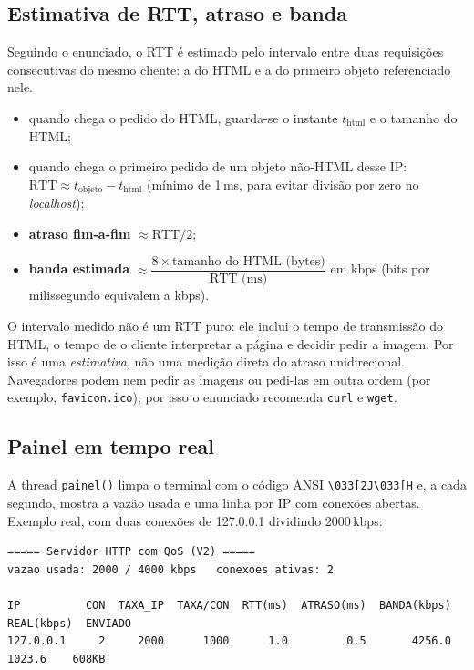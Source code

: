 \documentclass[11pt,a4paper]{article}
\begin{document}
\subsection{Estimativa de RTT, atraso e banda}
Seguindo o enunciado, o RTT é estimado pelo intervalo entre duas requisições consecutivas
do mesmo cliente: a do HTML e a do primeiro objeto referenciado nele.
\begin{itemize}
  \item quando chega o pedido do HTML, guarda-se o instante $t_{\text{html}}$ e o tamanho do HTML;
  \item quando chega o primeiro pedido de um objeto não-HTML desse IP:
  $\text{RTT} \approx t_{\text{objeto}} - t_{\text{html}}$ (mínimo de 1\,ms, para evitar
  divisão por zero no \emph{localhost});
  \item \textbf{atraso fim-a-fim} $\approx \text{RTT}/2$;
  \item \textbf{banda estimada} $\approx \dfrac{8 \times \text{tamanho do HTML (bytes)}}{\text{RTT (ms)}}$ em kbps
  (bits por milissegundo equivalem a kbps).
\end{itemize}

\begin{alerta}
O intervalo medido não é um RTT puro: ele inclui o tempo de transmissão do HTML, o tempo
de o cliente interpretar a página e decidir pedir a imagem. Por isso é uma
\emph{estimativa}, não uma medição direta do atraso unidirecional. Navegadores podem nem
pedir as imagens ou pedi-las em outra ordem (por exemplo, \texttt{favicon.ico}); por isso o
enunciado recomenda \texttt{curl} e \texttt{wget}.
\end{alerta}

\subsection{Painel em tempo real}
A thread \texttt{painel()} limpa o terminal com o código ANSI
\texttt{\textbackslash 033[2J\textbackslash 033[H} e, a cada segundo, mostra a vazão usada
e uma linha por IP com conexões abertas. Exemplo real, com duas conexões de 127.0.0.1
dividindo 2000\,kbps:

\begin{lstlisting}[columns=fixed,basicstyle=\ttfamily\scriptsize]
===== Servidor HTTP com QoS (V2) =====
vazao usada: 2000 / 4000 kbps   conexoes ativas: 2

IP          CON  TAXA_IP  TAXA/CON  RTT(ms)  ATRASO(ms)  BANDA(kbps)  REAL(kbps)  ENVIADO
127.0.0.1     2     2000      1000      1.0         0.5       4256.0      1023.6    608KB
\end{lstlisting}
\end{document}
